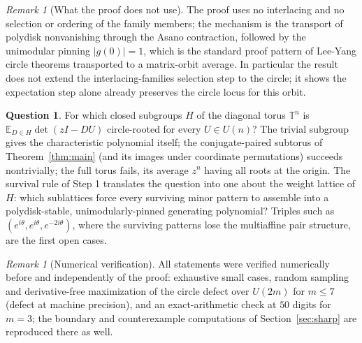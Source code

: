 \documentclass[11pt]{amsart}
\theoremstyle{definition}
\newtheorem{question}[theorem]{Question}
\theoremstyle{remark}
\newtheorem{remark}[theorem]{Remark}
\newcommand{\E}{\mathbb{E}}
\newcommand{\T}{\mathbb{T}}
\begin{document}
\begin{remark}[What the proof does not use]
The proof uses no interlacing and no selection or ordering of the family members; the mechanism is the transport of polydisk nonvanishing through the Asano contraction, followed by the unimodular pinning $|g(0)| = 1$, which is the standard proof pattern of Lee-Yang circle theorems transported to a matrix-orbit average. In particular the result does not extend the interlacing-families selection step to the circle; it shows the expectation step alone already preserves the circle locus for this orbit.
\end{remark}

\begin{question}\label{q:classify}
For which closed subgroups $H$ of the diagonal torus $\T^{n}$ is $\E_{D \in H} \det(zI - DU)$ circle-rooted for every $U \in U(n)$? The trivial subgroup gives the characteristic polynomial itself; the conjugate-paired subtorus of Theorem~\ref{thm:main} (and its images under coordinate permutations) succeeds nontrivially; the full torus fails, its average $z^n$ having all roots at the origin. The survival rule of Step 1 translates the question into one about the weight lattice of $H$: which sublattices force every surviving minor pattern to assemble into a polydisk-stable, unimodularly-pinned generating polynomial? Triples such as $(e^{i\theta}, e^{i\theta}, e^{-2i\theta})$, where the surviving patterns lose the multiaffine pair structure, are the first open cases.
\end{question}

\begin{remark}[Numerical verification]
All statements were verified numerically before and independently of the proof: exhaustive small cases, random sampling and derivative-free maximization of the circle defect over $U(2m)$ for $m \le 7$ (defect at machine precision), and an exact-arithmetic check at $50$ digits for $m = 3$; the boundary and counterexample computations of Section~\ref{sec:sharp} are reproduced there as well.
\end{remark}
\end{document}
